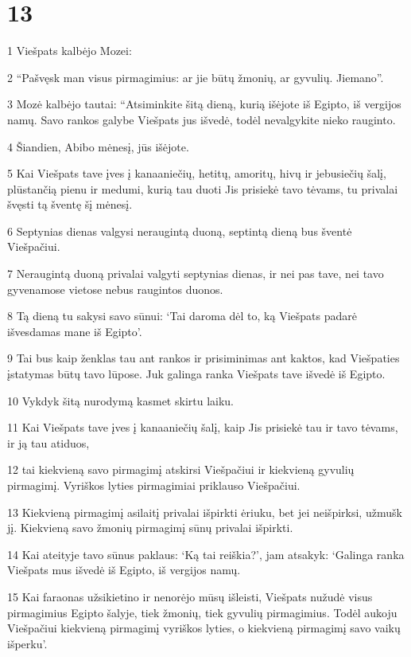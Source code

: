 \chapter{13}


\par 1 Viešpats kalbėjo Mozei: 
\par 2 “Pašvęsk man visus pirmagimius: ar jie būtų žmonių, ar gyvulių. Jie­mano”. 
\par 3 Mozė kalbėjo tautai: “Atsiminkite šitą dieną, kurią išėjote iš Egipto, iš vergijos namų. Savo rankos galybe Viešpats jus išvedė, todėl nevalgykite nieko rauginto. 
\par 4 Šiandien, Abibo mėnesį, jūs išėjote. 
\par 5 Kai Viešpats tave įves į kanaaniečių, hetitų, amoritų, hivų ir jebusiečių šalį, plūstančią pienu ir medumi, kurią tau duoti Jis prisiekė tavo tėvams, tu privalai švęsti tą šventę šį mėnesį. 
\par 6 Septynias dienas valgysi neraugintą duoną, septintą dieną bus šventė Viešpačiui. 
\par 7 Neraugintą duoną privalai valgyti septynias dienas, ir nei pas tave, nei tavo gyvenamose vietose nebus raugintos duonos. 
\par 8 Tą dieną tu sakysi savo sūnui: ‘Tai daroma dėl to, ką Viešpats padarė išvesdamas mane iš Egipto’. 
\par 9 Tai bus kaip ženklas tau ant rankos ir prisiminimas ant kaktos, kad Viešpaties įstatymas būtų tavo lūpose. Juk galinga ranka Viešpats tave išvedė iš Egipto. 
\par 10 Vykdyk šitą nurodymą kasmet skirtu laiku. 
\par 11 Kai Viešpats tave įves į kanaaniečių šalį, kaip Jis prisiekė tau ir tavo tėvams, ir ją tau atiduos, 
\par 12 tai kiekvieną savo pirmagimį atskirsi Viešpačiui ir kiekvieną gyvulių pirmagimį. Vyriškos lyties pirmagimiai priklauso Viešpačiui. 
\par 13 Kiekvieną pirmagimį asilaitį privalai išpirkti ėriuku, bet jei neišpirksi, užmušk jį. Kiekvieną savo žmonių pirmagimį sūnų privalai išpirkti. 
\par 14 Kai ateityje tavo sūnus paklaus: ‘Ką tai reiškia?’, jam atsakyk: ‘Galinga ranka Viešpats mus išvedė iš Egipto, iš vergijos namų. 
\par 15 Kai faraonas užsikietino ir nenorėjo mūsų išleisti, Viešpats nužudė visus pirmagimius Egipto šalyje, tiek žmonių, tiek gyvulių pirmagimius. Todėl aukoju Viešpačiui kiekvieną pirmagimį vyriškos lyties, o kiekvieną pirmagimį savo vaikų išperku’. 
